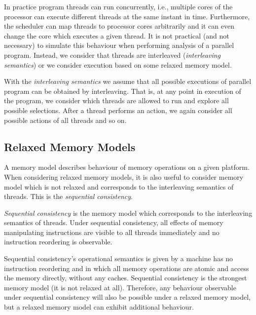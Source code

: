 In practice program threads can run concurrently, i.e., multiple cores of the
processor can execute different threads at the same instant in time.
Furthermore, the scheduler can map threads to processor cores arbitrarily and
it can even change the core which executes a given thread.
It is not practical (and not necessary) to simulate this behaviour when
performing analysis of a parallel program.
Instead, we consider that threads are interleaved (\emph{interleaving
semantics}) or we consider execution based on some relaxed memory model.

\begin{definition}
    With the \emph{interleaving semantics} we assume that all possible
    executions of parallel program can be obtained by interleaving.
    That is, at any point in execution of the program, we consider which threads
    are allowed to run and explore all possible selections.
    After a thread performs an action, we again consider all possible actions
    of all threads and so on.
\end{definition}



\subsection{Relaxed Memory Models}

A memory model describes behaviour of memory operations on a given platform.
When considering relaxed memory models, it is also useful to consider memory
model which is not relaxed and corresponds to the interleaving semantics of
threads.
This is the \emph{sequential consistency}.

\begin{definition}
    \emph{Sequential consistency} is the memory model which corresponds to the
    interleaving semantics of threads.
    Under sequential consistency, all effects of memory manipulating
    instructions are visible to all threads immediately and no instruction
    reordering is observable.
\end{definition}

Sequential consistency's operational semantics is given by a machine has no instruction reordering and in which all memory operations are atomic and access the memory directly, without any caches.
Sequential consistency is the strongest memory model (it is not relaxed at all).
Therefore, any behaviour observable under sequential consistency will also be possible under a relaxed memory model, but a relaxed memory model can exhibit additional behaviour.

